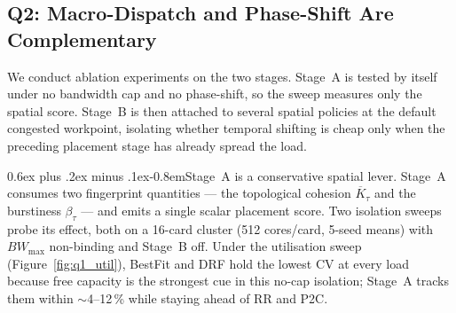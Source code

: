 \documentclass[letterpaper,twocolumn,10pt]{article}
\makeatletter
\newcommand{\tightparagraph}{\@startsection{paragraph}{4}{\z@}%
    {0.6ex plus .2ex minus .1ex}{-0.8em}{\normalfont\normalsize\bfseries}}
\makeatother
\begin{document}
\subsection{Q2: Macro-Dispatch and Phase-Shift Are Complementary}
\label{sec:eval:spatial}

We conduct ablation experiments on the two stages.
Stage~A is tested by itself under no bandwidth cap and no phase-shift, so the sweep measures only the spatial score. Stage~B is then attached to several spatial policies at the default congested workpoint, isolating whether temporal shifting is cheap only when the preceding placement stage has already spread the load.

\tightparagraph{Stage~A is a conservative spatial lever.} Stage~A consumes two fingerprint quantities --- the topological cohesion $\overline{K}_\tau$ and the burstiness $\beta_\tau$ --- and emits a single scalar placement score. Two isolation sweeps probe its effect, both on a 16-card cluster (512 cores/card, 5-seed means) with $BW_{\max}$ non-binding and Stage~B off. Under the utilisation sweep (Figure~\ref{fig:q1_util}), BestFit and DRF hold the lowest CV at every load because free capacity is the strongest cue in this no-cap isolation; Stage~A tracks them within $\sim$4--12\,\% while staying ahead of RR and P2C.
\end{document}
